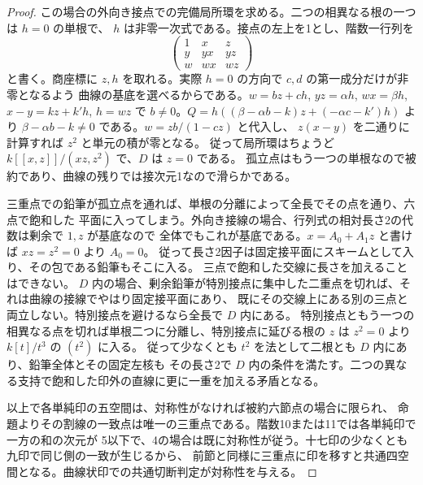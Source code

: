\begin{proof}
この場合の外向き接点での完備局所環を求める。二つの相異なる根の一つは $h=0$ の単根で、
$h$ は非零一次式である。接点の左上を1とし、階数一行列を
\[
 \begin{pmatrix}1&x&z\\ y&yx&yz\\ w&wx&wz\end{pmatrix}
\]
と書く。商座標に $z,h$ を取れる。実際 $h=0$ の方向で $c,d$ の第一成分だけが非零となるよう
曲線の基底を選べるからである。$w=bz+ch$, $yz=\alpha h$, $wx=\beta h$,
$x-y=kz+k'h$, $h=wz$ で $b\ne0$。$Q=h((\beta-\alpha b-k)z+(-\alpha c-k')h)$
より $\beta-\alpha b-k\ne0$ である。$w=z b/(1-cz)$ と代入し、
$z(x-y)$ を二通りに計算すれば $z^2$ と単元の積が零となる。
従って局所環はちょうど $k[[x,z]]/(xz,z^2)$ で、$D$ は $z=0$ である。
孤立点はもう一つの単根なので被約であり、曲線の残りでは接次元1なので滑らかである。

三重点での鉛筆が孤立点を通れば、単根の分離によって全長でその点を通り、六点で飽和した
平面に入ってしまう。外向き接線の場合、行列式の相対長さ2の代数は剰余で $1,z$ が基底なので
全体でもこれが基底である。$x=A_0+A_1z$ と書けば $xz=z^2=0$ より $A_0=0$。
従って長さ2因子は固定接平面にスキームとして入り、その包である鉛筆もそこに入る。
三点で飽和した交線に長さを加えることはできない。
$D$ 内の場合、剰余鉛筆が特別接点に集中した二重点を切れば、それは曲線の接線でやはり固定接平面にあり、
既にその交線上にある別の三点と両立しない。特別接点を避けるなら全長で $D$ 内にある。
特別接点ともう一つの相異なる点を切れば単根二つに分離し、特別接点に延びる根の
$z$ は $z^2=0$ より $k[t]/t^3$ の $(t^2)$ に入る。
従って少なくとも $t^2$ を法として二根とも $D$ 内にあり、鉛筆全体とその固定左核も
その長さ2で $D$ 内の条件を満たす。二つの異なる支持で飽和した印外の直線に更に一重を加える矛盾となる。

以上で各単純印の五空間は、対称性がなければ被約六節点の場合に限られ、
命題よりその割線の一致点は唯一の三重点である。階数10または11では各単純印で一方の和の次元が
5以下で、4の場合は既に対称性が従う。十七印の少なくとも九印で同じ側の一致が生じるから、
前節と同様に三重点に印を移すと共通四空間となる。曲線状印での共通切断判定が対称性を与える。
\end{proof}
